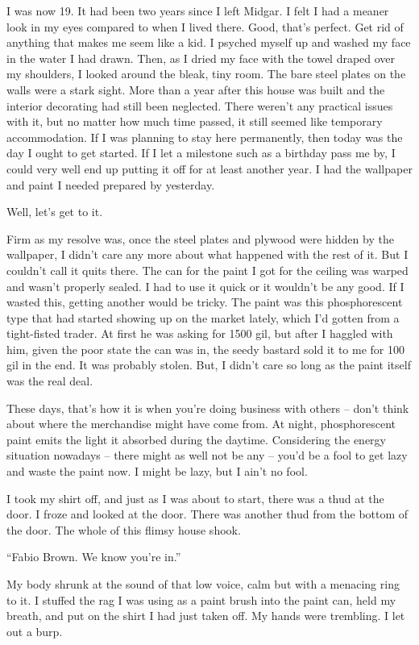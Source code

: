 \documentclass[oneside]{book}
\begin{document}
I was now 19. It had been two years since I left Midgar. I felt I had a meaner look in my eyes compared to when I lived there. Good, that’s perfect. Get rid of anything that makes me seem like a kid. I psyched myself up and washed my face in the water I had drawn. Then, as I dried my face with the towel draped over my shoulders, I looked around the bleak, tiny room. The bare steel plates on the walls were a stark sight. More than a year after this house was built and the interior decorating had still been neglected. There weren’t any practical issues with it, but no matter how much time passed, it still seemed like temporary accommodation. If I was planning to stay here permanently, then today was the day I ought to get started. If I let a milestone such as a birthday pass me by, I could very well end up putting it off for at least another year. I had the wallpaper and paint I needed prepared by yesterday.

Well, let’s get to it.

Firm as my resolve was, once the steel plates and plywood were hidden by the wallpaper, I didn’t care any more about what happened with the rest of it. But I couldn’t call it quits there. The can for the paint I got for the ceiling was warped and wasn’t properly sealed. I had to use it quick or it wouldn’t be any good. If I wasted this, getting another would be tricky. The paint was this phosphorescent type that had started showing up on the market lately, which I’d gotten from a tight-fisted trader. At first he was asking for 1500 gil, but after I haggled with him, given the poor state the can was in, the seedy bastard sold it to me for 100 gil in the end. It was probably stolen. But, I didn’t care so long as the paint itself was the real deal.

These days, that’s how it is when you’re doing business with others – don’t think about where the merchandise might have come from. At night, phosphorescent paint emits the light it absorbed during the daytime. Considering the energy situation nowadays – there might as well not be any – you’d be a fool to get lazy and waste the paint now. I might be lazy, but I ain’t no fool.

I took my shirt off, and just as I was about to start, there was a thud at the door. I froze and looked at the door. There was another thud from the bottom of the door. The whole of this flimsy house shook.

“Fabio Brown. We know you’re in.”

My body shrunk at the sound of that low voice, calm but with a menacing ring to it. I stuffed the rag I was using as a paint brush into the paint can, held my breath, and put on the shirt I had just taken off. My hands were trembling. I let out a burp.
\end{document}
